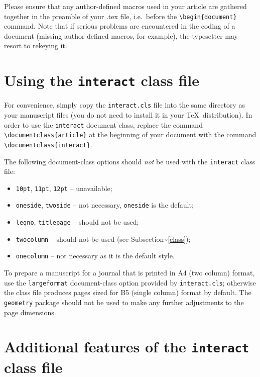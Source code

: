 \documentclass[]{interact}
\theoremstyle{plain}%
\theoremstyle{definition}
\theoremstyle{remark}
\def\tightlist{}
\begin{document}
Please ensure that any author-defined macros used in your article are
gathered together in the preamble of your .tex file, i.e.~before the
\texttt{\textbackslash{}begin\{document\}} command. Note that if serious
problems are encountered in the coding of a document (missing
author-defined macros, for example), the typesetter may resort to
rekeying it.

\hypertarget{using-the-interact-class-file}{%
\section{\texorpdfstring{Using the \texttt{interact} class
file}{Using the interact class file}}\label{using-the-interact-class-file}}

For convenience, simply copy the \texttt{interact.cls} file into the
same directory as your manuscript files (you do not need to install it
in your \TeX~distribution). In order to use the \texttt{interact}
document class, replace the command
\texttt{\textbackslash{}documentclass\{article\}} at the beginning of
your document with the command
\texttt{\textbackslash{}documentclass\{interact\}}.

The following document-class options should \emph{not} be used with the
\texttt{interact} class file:

\begin{itemize}
\tightlist
\item
  \texttt{10pt}, \texttt{11pt}, \texttt{12pt} -- unavailable;
\item
  \texttt{oneside}, \texttt{twoside} -- not necessary, \texttt{oneside}
  is the default;
\item
  \texttt{leqno}, \texttt{titlepage} -- should not be used;
\item
  \texttt{twocolumn} -- should not be used (see
  Subsection\textasciitilde{}\ref{class});
\item
  \texttt{onecolumn} -- not necessary as it is the default style.
\end{itemize}

To prepare a manuscript for a journal that is printed in A4 (two column)
format, use the \texttt{largeformat} document-class option provided by
\texttt{interact.cls}; otherwise the class file produces pages sized for
B5 (single column) format by default. The \texttt{geometry} package
should not be used to make any further adjustments to the page
dimensions.

\hypertarget{additional-features-of-the-interact-class-file}{%
\section{\texorpdfstring{Additional features of the \texttt{interact}
class
file}{Additional features of the interact class file}}\label{additional-features-of-the-interact-class-file}}
\end{document}
